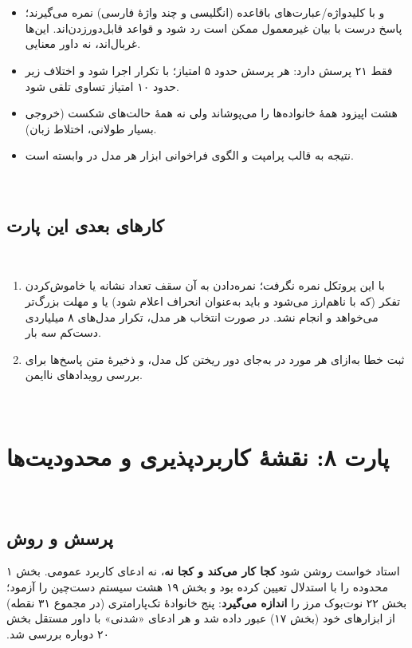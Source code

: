 ‫\documentclass[a4paper,12pt]{article}
\begin{document}
‫\begin{itemize}
‫\item {} و  با کلیدواژه/عبارت‌های باقاعده (انگلیسی و چند واژهٔ فارسی) نمره می‌گیرند؛ پاسخ درست با بیان غیرمعمول ممکن است رد شود و قواعد قابل‌دور‌زدن‌اند. این‌ها غربال‌اند، نه داور معنایی.
‫\item {} فقط ۲۱ پرسش دارد: هر پرسش حدود ۵ امتیاز؛ با  تکرار اجرا شود و اختلاف زیر حدود ۱۰ امتیاز تساوی تلقی شود.
‫\item هشت اپیزود همهٔ خانواده‌ها را می‌پوشاند ولی نه همهٔ حالت‌های شکست (خروجی بسیار طولانی، اختلاط زبان).
‫\item نتیجه به قالب پرامپت و الگوی فراخوانی ابزار هر مدل در  وابسته است.
‫\end{itemize}
‫
‫\subsection{کارهای بعدی این پارت}
‫\begin{enumerate}
‫\item {} با این پروتکل نمره نگرفت؛ نمره‌دادن به آن سقف تعداد نشانه یا خاموش‌کردن تفکر (که با  ناهم‌ارز می‌شود و باید به‌عنوان انحراف اعلام شود) یا  و مهلت بزرگ‌تر می‌خواهد و انجام نشد. در صورت انتخاب هر مدل، تکرار مدل‌های ۸ میلیاردی دست‌کم سه بار.
‫\item ثبت خطا به‌ازای هر مورد در \texttt{} به‌جای دور ریختن کل مدل، و ذخیرهٔ متن پاسخ‌ها برای بررسی رویدادهای ناایمن.
‫\end{enumerate}
‫\section{پارت ۸: نقشهٔ کاربردپذیری و محدودیت‌ها}
‫
‫\subsection{پرسش و روش}
‫استاد خواست روشن شود \textbf{ کجا کار می‌کند و کجا نه}، نه ادعای کاربرد عمومی. بخش ۱ محدوده را با استدلال تعیین کرده بود و بخش ۱۹ هشت سیستم دست‌چین را آزمود؛ بخش ۲۲ نوت‌بوک مرز را \textbf{اندازه می‌گیرد}: پنج خانوادهٔ تک‌پارامتری (در مجموع ۳۱ نقطه) از ابزارهای خود  (بخش ۱۷) عبور داده شد و هر ادعای «شدنی» با داور مستقل بخش ۲۰ دوباره بررسی شد.
\end{document}
